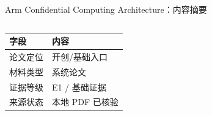 \begin{frame}[t,shrink=6]{Arm Confidential Computing Architecture：内容摘要}
\begin{columns}[T,totalwidth=\textwidth]
\begin{column}{0.49\textwidth}
{\begin{minipage}[t]{0.97\linewidth}
    \hspace{1.4mm}\begin{minipage}{0.92\linewidth}
      \scriptsize {\tiny
\begin{tabularx}{\linewidth}{@{}YY@{}}
\toprule
\textbf{字段} & \textbf{内容} \\
\midrule
论文定位 & 开创/基础入口 \\
材料类型 & 系统论文 \\
证据等级 & E1 / 基础证据 \\
来源状态 & 本地 PDF 已核验 \\
\bottomrule
\end{tabularx}
}
    \end{minipage}
    \vspace{1mm}
  \end{minipage}}
  \end{column}
\end{columns}
\end{frame}


